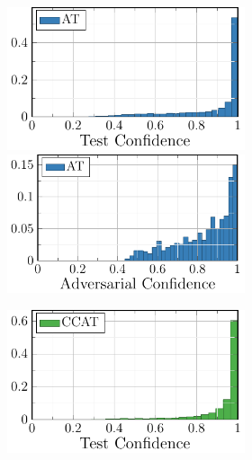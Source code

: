 \begin{figure}[t]
\begin{subfigure}[t]{0.485\textwidth}
\begin{subfigure}[t]{0.49\textwidth}
            \centering
            \includegraphics[width=1\textwidth]{fig_cifar10_corr_advtrain}
            
            \includegraphics[width=1\textwidth]{fig_cifar10_succ_advtrain}
        \end{subfigure}
        \begin{subfigure}[t]{0.49\textwidth}
            \vspace*{0px}
            
            \centering
            \includegraphics[width=1\textwidth]{fig_cifar10_corr_ours10}
            

\end{subfigure}
\end{subfigure}
\end{figure}
